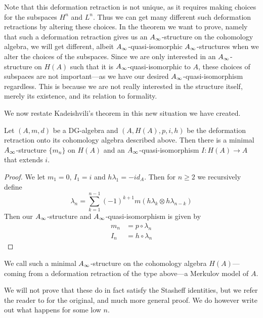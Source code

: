 Note that this deformation retraction is not unique, as it requires making choices for the subspaces $H^n$ and $L^n$. Thus we can get many different such deformation retractions by altering these choices. In the theorem we want to prove, namely that such a deformation retraction gives us an $A_{\infty}$-structure on the cohomology algebra, we will get different, albeit $A_{\infty}$-quasi-isomorphic $A_{\infty}$-structures when we alter the choices of the subspaces. Since we are only interested in an $A_{\infty}$-structure on $H(A)$ such that it is $A_{\infty}$-quasi-isomorphic to $A$, these choices of subspaces are not important---as we have our desired $A_{\infty}$-quasi-isomorphism regardless. This is because we are not really interested in the structure itself, merely its existence, and its relation to formality. 

We now restate Kadeishvili's theorem in this new situation we have created.

\begin{theorem}
Let $(A, m, d)$ be a DG-algebra and $(A, H(A), p, i, h)$ be the deformation retraction onto its cohomology algebra described above. Then there is a minimal $A_{\infty}$-structure $\{m_n\}$ on $H(A)$ and an $A_{\infty}$-quasi-isomorphism $I\colon H(A)\longrightarrow A$ that extends $i$. 
\end{theorem}
\begin{proof}
We let $m_1=0$, $I_1=i$ and $h\lambda_1 = -id_A$. Then for $n\geq 2$ we recursively define
\begin{equation*}
    \lambda_n = \sum_{k=1}^{n-1}(-1)^{k+1}m(h\lambda_k\otimes h\lambda_{n-k})
\end{equation*}
Then our $A_{\infty}$-structure and $A_{\infty}$-quasi-isomorphism is given by 
\begin{align*}
    m_n &= p\circ \lambda_n \\
    I_n &= h\circ \lambda_n
\end{align*}
\end{proof}

We call such a minimal $A_{\infty}$-structure on the cohomology algebra $H(A)$---coming from a deformation retraction of the type above---a Merkulov model of $A$. 

We will not prove that these do in fact satisfy the Stasheff identities, but we refer the reader to \cite{kadeishvili} for the original, and much more general proof. We do however write out what happens for some low $n$. 


